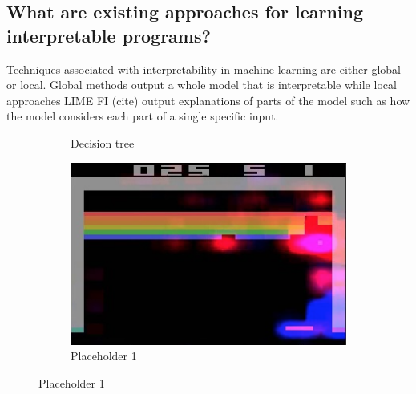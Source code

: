 \subsection{What are existing approaches for learning interpretable programs?}
Techniques associated with interpretability in machine learning are either global or local. 
Global methods output a whole model that is interpretable while local approaches LIME FI (cite) output explanations of parts of the model such as how the model considers each part of a single specific input.
\begin{figure}[htbp]
    \centering
    \begin{subfigure}[b]{0.32\textwidth}
        \centering
        \caption{Decision tree}
        \label{fig:decision-tree}
    \end{subfigure}
    \hfill
    \begin{subfigure}[b]{0.32\textwidth}
        \centering
        \includegraphics[width=\textwidth]{images/images_intro/breakout_control.png}
        \caption{Placeholder 1}
        \label{fig:placeholder1}
    \end{subfigure}

\end{figure}
